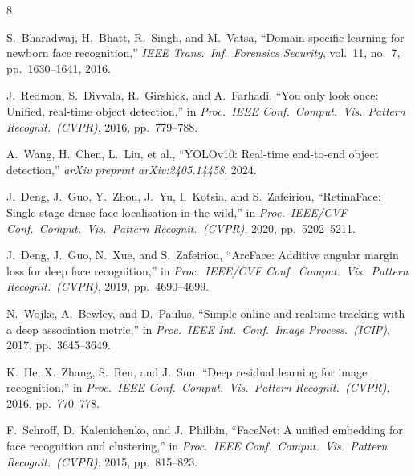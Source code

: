 \documentclass[conference, 10pt]{IEEEtran}
\begin{document}
\begin{thebibliography}{8}

S.~Bharadwaj, H.~Bhatt, R.~Singh, and M.~Vatsa, ``Domain specific learning for
newborn face recognition,'' \emph{IEEE Trans.\ Inf.\ Forensics Security}, vol.~11, no.~7,
pp.~1630--1641, 2016.

J.~Redmon, S.~Divvala, R.~Girshick, and A.~Farhadi, ``You only look once: Unified,
real-time object detection,'' in \emph{Proc.\ IEEE Conf.\ Comput.\ Vis.\ Pattern Recognit.\
(CVPR)}, 2016, pp.~779--788.

A.~Wang, H.~Chen, L.~Liu, et al., ``YOLOv10: Real-time end-to-end object detection,''
\emph{arXiv preprint arXiv:2405.14458}, 2024.

J.~Deng, J.~Guo, Y.~Zhou, J.~Yu, I.~Kotsia, and S.~Zafeiriou, ``RetinaFace:
Single-stage dense face localisation in the wild,'' in \emph{Proc.\ IEEE/CVF Conf.\ Comput.\
Vis.\ Pattern Recognit.\ (CVPR)}, 2020, pp.~5202--5211.

J.~Deng, J.~Guo, N.~Xue, and S.~Zafeiriou, ``ArcFace: Additive angular margin loss
for deep face recognition,'' in \emph{Proc.\ IEEE/CVF Conf.\ Comput.\ Vis.\ Pattern Recognit.\
(CVPR)}, 2019, pp.~4690--4699.

\bibitem{ref_deepsort}
N.~Wojke, A.~Bewley, and D.~Paulus, ``Simple online and realtime tracking with a deep
association metric,'' in \emph{Proc.\ IEEE Int.\ Conf.\ Image Process.\ (ICIP)}, 2017,
pp.~3645--3649.

\bibitem{ref_resnet}
K.~He, X.~Zhang, S.~Ren, and J.~Sun, ``Deep residual learning for image recognition,''
in \emph{Proc.\ IEEE Conf.\ Comput.\ Vis.\ Pattern Recognit.\ (CVPR)}, 2016, pp.~770--778.

\bibitem{ref_facenet}
F.~Schroff, D.~Kalenichenko, and J.~Philbin, ``FaceNet: A unified embedding for face
recognition and clustering,'' in \emph{Proc.\ IEEE Conf.\ Comput.\ Vis.\ Pattern Recognit.\
(CVPR)}, 2015, pp.~815--823.

\end{thebibliography}
\end{document}
